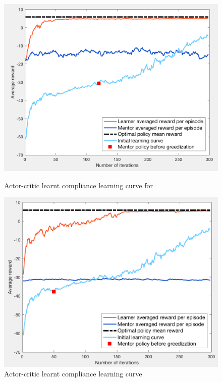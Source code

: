 \documentclass[a4paper]{report}
\begin{document}
{{{{				\begin{figure}[ht!]
					\begin{minipage}{0.5\linewidth}
						\begin{center}
							\includegraphics[width=0.95\linewidth]{ac_il_subopt_120}
							\caption{Actor-critic learnt compliance learning curve for }
							\label{fig::ac_il_subopt_120}
						\end{center}
					\end{minipage}
					\begin{minipage}{0.5\linewidth}
						\begin{center}
							\includegraphics[width=0.95\linewidth]{ac_il_subopt_50}
							\caption{Actor-critic learnt compliance learning curve}
							\label{fig::ac_il_subopt_50}
						\end{center}
					\end{minipage}
				\end{figure}
				
}}}}
\end{document}
